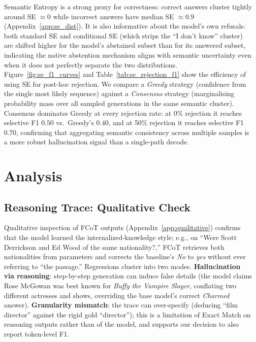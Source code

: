 \documentclass[11pt]{article}
\begin{document}
Semantic Entropy is a strong proxy for correctness: correct answers cluster tightly around SE $\approx 0$ while incorrect answers have median SE $\approx 0.9$ (Appendix~\ref{app:se_dist}). It is also informative about the model's own refusals: both standard SE and conditional SE (which strips the ``I don't know'' cluster) are shifted higher for the model's abstained subset than for its answered subset, indicating the native abstention mechanism aligns with semantic uncertainty even when it does not perfectly separate the two distributions. Figure~\ref{fig:se_f1_curves} and Table~\ref{tab:se_rejection_f1} show the efficiency of using SE for post-hoc rejection. We compare a \emph{Greedy} strategy (confidence from the single most likely sequence) against a \emph{Consensus} strategy (marginalising probability mass over all sampled generations in the same semantic cluster). Consensus dominates Greedy at every rejection rate: at 0\% rejection it reaches selective F1 $0.50$ vs.\ Greedy's $0.40$, and at 50\% rejection it reaches selective F1 $\mathbf{0.70}$, confirming that aggregating semantic consistency across multiple samples is a more robust hallucination signal than a single-path decode.
\section{Analysis}

\subsection{Reasoning Trace: Qualitative Check}

Qualitative inspection of FCoT outputs (Appendix~\ref{app:qualitative}) confirms that the model learned the internalized-knowledge style; e.g., on ``Were Scott Derrickson and Ed Wood of the same nationality?,'' FCoT retrieves both nationalities from parameters and corrects the baseline's \emph{No} to \emph{yes} without ever referring to ``the passage.'' Regressions cluster into two modes. \textbf{Hallucination via reasoning}: step-by-step generation can induce false details (the model claims Rose McGowan was best known for \emph{Buffy the Vampire Slayer}, conflating two different actresses and shows, overriding the base model's correct \emph{Charmed} answer). \textbf{Granularity mismatch}: the trace can over-specify (deducing ``film director'' against the rigid gold ``director''); this is a limitation of Exact Match on reasoning outputs rather than of the model, and supports our decision to also report token-level F1.
\end{document}
